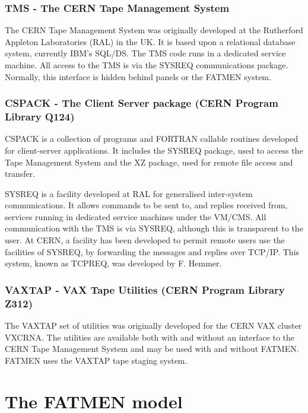 \subsection{TMS - The CERN Tape Management System}
\par
The CERN Tape Management System was originally developed at
the Rutherford Appleton Laboratories (RAL) in the
UK. It is based upon a relational database system, currently IBM's
SQL/DS. The TMS code runs in a dedicated service machine. All access
to the TMS is via the SYSREQ communications package. Normally, this
interface is hidden behind panels or the FATMEN system.
\subsection{CSPACK - The Client Server package (CERN Program Library Q124)}
\par
{}
CSPACK is a collection of programs and FORTRAN callable routines
developed for client-server applications. It includes the SYSREQ
package, used to access the Tape Management System and the
XZ package, used for remote file access and transfer.
\par
SYSREQ is a facility developed at RAL
for generalised inter-system communications. It allows
commands to be sent to, and replies received from, services running
in dedicated service machines under the VM/CMS. All communication with
the TMS is via SYSREQ, although this is transparent to the user.
At CERN, a facility has
been developed to permit remote users use the facilities of SYSREQ,
by forwarding the messages and replies over TCP/IP. This system,
known as TCPREQ, was developed by F. Hemmer.
\subsection{VAXTAP - VAX Tape Utilities (CERN Program Library Z312)}
\par
The VAXTAP set of utilities was originally developed for the
CERN VAX cluster VXCRNA. The utilities are available both with
and without an interface to the CERN Tape Management System
and may be used with and without FATMEN. 
FATMEN uses the VAXTAP tape staging system.

\chapter{The FATMEN model}

